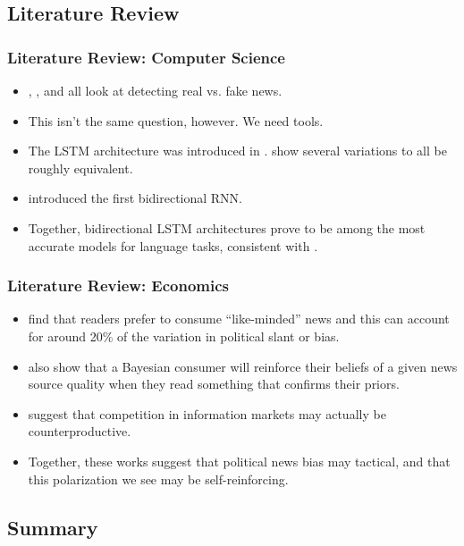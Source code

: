 \documentclass{beamer}
\begin{document}
	\subsection{Literature Review}
	
	\begin{frame}
		\frametitle{Literature Review: Computer Science}
		\begin{itemize}
			\item \citet{volkova2017separating}, \citet{wang2017liar}, and \citet{shu2017fake} all look at detecting real vs. fake news. 
			\item This isn't the same question, however. We need tools. 
			\item The LSTM architecture was introduced in \citet{hochreiter1997long}. \citet{greff2016lstm} show several variations to all be roughly equivalent. 
			\item \citet{schuster1997bidirectional} introduced the first bidirectional RNN. 
			\item Together, bidirectional LSTM architectures prove to be among the most accurate models for language tasks, consistent with \citet{wang2015unified}. 
		\end{itemize}
	\end{frame}
	
	\begin{frame}
		\frametitle{Literature Review: Economics}
		\begin{itemize}
			\item \citet{gentzkow2010drives} find that readers prefer to consume ``like-minded'' news and this can account for around 20\% of the variation in political slant or bias.
			\item \citet{gentzkow2006media} also show that a Bayesian consumer will reinforce their beliefs of a given news source quality when they read something that confirms their priors.
			\item \citet{gentzkow2008competition} suggest that competition in information markets may actually be counterproductive. 
			\item Together, these works suggest that political news bias may tactical, and that this polarization we see may be self-reinforcing.
		\end{itemize}
	\end{frame}

    \subsection{Summary}
    
\end{document}
